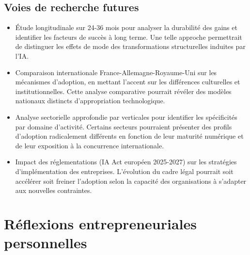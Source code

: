 \subsection{Voies de recherche futures}
\begin{itemize}
    \item Étude longitudinale sur 24-36 mois pour analyser la durabilité des gains et identifier les facteurs de succès à long terme. Une telle approche permettrait de distinguer les effets de mode des transformations structurelles induites par l'IA.
    \item Comparaison internationale France-Allemagne-Royaume-Uni sur les mécanismes d’adoption, en mettant l'accent sur les différences culturelles et institutionnelles. Cette analyse comparative pourrait révéler des modèles nationaux distincts d'appropriation technologique.
    \item Analyse sectorielle approfondie par verticales pour identifier les spécificités par domaine d'activité. Certains secteurs pourraient présenter des profils d'adoption radicalement différents en fonction de leur maturité numérique et de leur exposition à la concurrence internationale.
    \item Impact des réglementations (IA Act européen 2025-2027) sur les stratégies d'implémentation des entreprises. L'évolution du cadre légal pourrait soit accélérer soit freiner l'adoption selon la capacité des organisations à s'adapter aux nouvelles contraintes.
\end{itemize}

\section{Réflexions entrepreneuriales personnelles}

